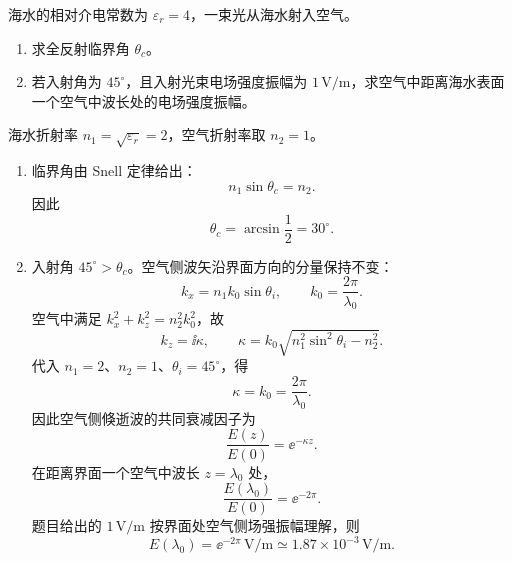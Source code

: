 
\begin{question}[海水到空气的全反射与倏逝波]
海水的相对介电常数为 $\varepsilon_r=4$，一束光从海水射入空气。
\begin{enumerate}
  \item 求全反射临界角 $\theta_c$。
  \item 若入射角为 $45^\circ$，且入射光束电场强度振幅为 $1\,\mathrm{V/m}$，求空气中距离海水表面一个空气中波长处的电场强度振幅。
\end{enumerate}
\begin{solution}
海水折射率 $n_1=\sqrt{\varepsilon_r}=2$，空气折射率取 $n_2=1$。
\begin{enumerate}
  \item 临界角由 Snell 定律给出：
  \[
    n_1\sin\theta_c=n_2 .
  \]
  因此
  \[
    \boxed{\theta_c=\arcsin\frac{1}{2}=30^\circ} .
  \]

  \item 入射角 $45^\circ>\theta_c$。空气侧波矢沿界面方向的分量保持不变：
  \[
    k_x=n_1k_0\sin\theta_i,
    \qquad k_0=\frac{2\pi}{\lambda_0} .
  \]
  空气中满足 $k_x^2+k_z^2=n_2^2k_0^2$，故
  \[
    k_z=\ii\kappa,
    \qquad
    \kappa=k_0\sqrt{n_1^2\sin^2\theta_i-n_2^2}.
  \]
  代入 $n_1=2$、$n_2=1$、$\theta_i=45^\circ$，得
  \[
    \kappa=k_0=\frac{2\pi}{\lambda_0} .
  \]
  因此空气侧倏逝波的共同衰减因子为
  \[
    \frac{E(z)}{E(0)}=\ee^{-\kappa z} .
  \]
  在距离界面一个空气中波长 $z=\lambda_0$ 处，
  \[
    \boxed{\frac{E(\lambda_0)}{E(0)}=\ee^{-2\pi}} .
  \]
  题目给出的 $1\,\mathrm{V/m}$ 按界面处空气侧场强振幅理解，则
  \[
    \boxed{E(\lambda_0)=\ee^{-2\pi}\,\mathrm{V/m}
    \simeq1.87\times10^{-3}\,\mathrm{V/m}} .
  \]
\end{enumerate}
\end{solution}
\end{question}

